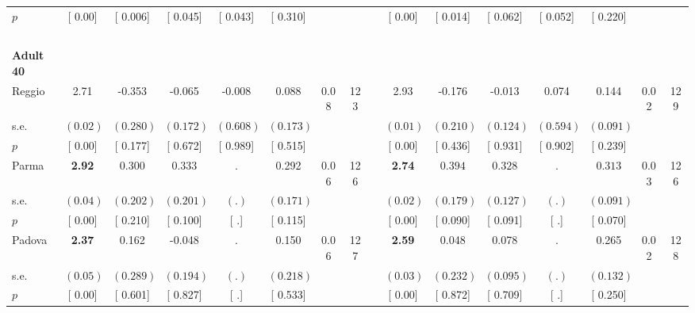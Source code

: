 \begin{longtable}{L{8em} c c c c c c c p{1em} c c c c c c c}
\quad \quad \quad \quad $ p$ & [     0.00] & [    0.006] & [    0.045] & [    0.043] & [    0.310] & & & & [     0.00] & [    0.014] & [    0.062] & [    0.052] & [    0.220] & &  \\[1em]
~\\[1em]
\quad \quad \textbf{Adult 40} & & & & & & & & & & & & & & & \\* 
\quad \quad \quad Reggio& 2.71 &    -0.353 &    -0.065 &    -0.008 &     0.088 &      0.08 &       123 & & 2.93 &    -0.176 &    -0.013 &     0.074 &     0.144 &      0.02 &       129  \\*
\quad \quad \quad \quad s.e.& $ (     0.02)$ & $ (    0.280)$ & $ (    0.172)$ & $ (    0.608)$ & $ (    0.173)$ & & & & $ (     0.01)$ & $ (    0.210)$ & $ (    0.124)$ & $ (    0.594)$ & $ (    0.091)$ & &  \\*
\quad \quad \quad \quad $ p$ & [     0.00] & [    0.177] & [    0.672] & [    0.989] & [    0.515] & & & & [     0.00] & [    0.436] & [    0.931] & [    0.902] & [    0.239] & &  \\[1em]
\quad \quad \quad Parma& \textbf{     2.92} &     0.300 & $ \mathbf{    0.333}$ &         . &     0.292 &      0.06 &       126 & & \textbf{     2.74} & $ \mathbf{    0.394}$ & $ \mathbf{    0.328}$ &         . & $ \mathbf{    0.313}$ &      0.03 &       126  \\*
\quad \quad \quad \quad s.e.& $ (     0.04)$ & $ (    0.202)$ & $ (    0.201)$ & $ (        .)$ & $ (    0.171)$ & & & & $ (     0.02)$ & $ (    0.179)$ & $ (    0.127)$ & $ (        .)$ & $ (    0.091)$ & &  \\*
\quad \quad \quad \quad $ p$ & [     0.00] & [    0.210] & [    0.100] & [        .] & [    0.115] & & & & [     0.00] & [    0.090] & [    0.091] & [        .] & [    0.070] & &  \\[1em]
\quad \quad \quad Padova& \textbf{     2.37} &     0.162 &    -0.048 &         . &     0.150 &      0.06 &       127 & & \textbf{     2.59} &     0.048 &     0.078 &         . &     0.265 &      0.02 &       128  \\*
\quad \quad \quad \quad s.e.& $ (     0.05)$ & $ (    0.289)$ & $ (    0.194)$ & $ (        .)$ & $ (    0.218)$ & & & & $ (     0.03)$ & $ (    0.232)$ & $ (    0.095)$ & $ (        .)$ & $ (    0.132)$ & &  \\*
\quad \quad \quad \quad $ p$ & [     0.00] & [    0.601] & [    0.827] & [        .] & [    0.533] & & & & [     0.00] & [    0.872] & [    0.709] & [        .] & [    0.250] & &  \\[1em]

\end{longtable}
